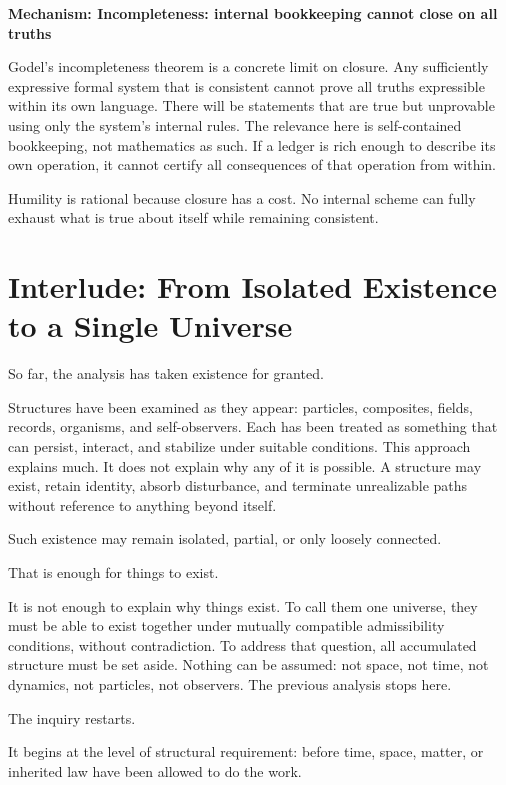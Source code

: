 \documentclass[11pt,twoside,openright]{book}
\newenvironment{mechanismbox}[1]
  {\begin{framed}\noindent\textbf{Mechanism: #1}\par\medskip}
  {\end{framed}}
\begin{document}
\begin{mechanismbox}{Incompleteness: internal bookkeeping cannot close on all truths}

Godel's incompleteness theorem is a concrete limit on closure. Any sufficiently expressive formal system that is consistent cannot prove all truths expressible within its own language. There will be statements that are true but unprovable using only the system's internal rules. The relevance here is self-contained bookkeeping, not mathematics as such. If a ledger is rich enough to describe its own operation, it cannot certify all consequences of that operation from within.

Humility is rational because closure has a cost. No internal scheme can fully exhaust what is true about itself while remaining consistent.

\end{mechanismbox}
\clearpage
{%
  \let\cleardoublepage\clearpage
\chapter{Interlude: From Isolated Existence to a Single Universe}
}
So far,
the analysis has taken existence for granted.

Structures have been examined as they appear: particles, composites, fields, records, organisms, and self-observers. Each has been treated as something that can persist, interact, and stabilize under suitable conditions. This approach explains much. It does not explain why any of it is possible. A structure may exist, retain identity, absorb disturbance, and terminate unrealizable paths without reference to anything beyond itself.

Such existence may remain isolated, partial, or only loosely connected.

That is enough for things to exist.

It is not enough to explain why things exist. To call them one universe, they must be able to exist together under mutually compatible admissibility conditions, without contradiction. To address that question, all accumulated structure must be set aside. Nothing can be assumed: not space, not time, not dynamics, not particles, not observers. The previous analysis stops here.

The inquiry restarts.

It begins at the level of structural requirement: before time, space, matter, or inherited law have been allowed to do the work.
\end{document}
